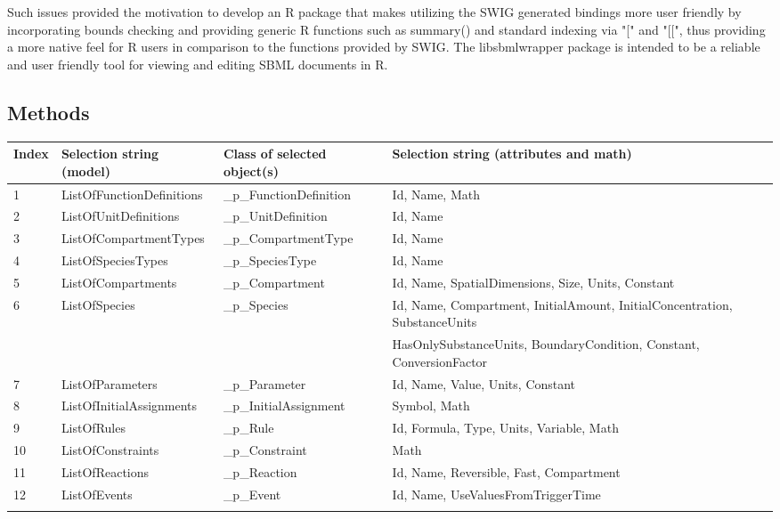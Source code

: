 \documentclass{bioinfo}
\begin{document}
\par Such issues provided the motivation to develop an R package that makes utilizing the SWIG generated bindings more user friendly by incorporating bounds checking and providing generic R functions such as {\selectfont summary()} and standard indexing via "{\selectfont [}" and "{\selectfont [[}", thus providing a more native feel for R users in comparison to the functions provided by SWIG. The libsbmlwrapper package is intended to be a reliable and user friendly tool for viewing and editing SBML documents in R.

\begin{methods}
\section{Methods}

\begin{table*}
\centering
{}
{\begin{tabular}{llll}\toprule
Index & Selection string (model) & Class of selected object(s) & Selection string (attributes and math)\\\midrule
1 & ListOfFunctionDefinitions & \_p\_FunctionDefinition & Id, Name, Math\\
2 & ListOfUnitDefinitions & \_p\_UnitDefinition &Id, Name\\
3 & ListOfCompartmentTypes & \_p\_CompartmentType & Id, Name\\
4 & ListOfSpeciesTypes & \_p\_SpeciesType & Id, Name\\
5 & ListOfCompartments & \_p\_Compartment & Id, Name, SpatialDimensions, Size, Units, Constant\\
6 & ListOfSpecies & \_p\_Species & Id, Name, Compartment, InitialAmount, InitialConcentration, SubstanceUnits\\
 & & & HasOnlySubstanceUnits, BoundaryCondition, Constant, ConversionFactor\\
7 & ListOfParameters & \_p\_Parameter & Id, Name, Value, Units, Constant\\
8 & ListOfInitialAssignments & \_p\_InitialAssignment & Symbol, Math\\
9 & ListOfRules & \_p\_Rule & Id, Formula, Type, Units, Variable, Math\\
10 & ListOfConstraints & \_p\_Constraint & Math\\
11 & ListOfReactions & \_p\_Reaction & Id, Name, Reversible, Fast, Compartment\\
12 & ListOfEvents & \_p\_Event & Id, Name, UseValuesFromTriggerTime\\\botrule
\end{tabular}} {}
\end{table*}


\end{methods}
\end{document}
